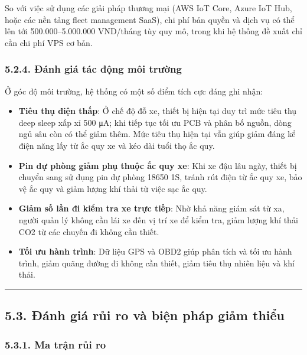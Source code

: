 \documentclass[a4paper]{extarticle}
\providecommand{\tightlist}{%
  \setlength{\itemsep}{0pt}\setlength{\parskip}{0pt}}
\begin{document}
So với việc sử dụng các giải pháp thương mại (AWS IoT Core, Azure IoT
Hub, hoặc các nền tảng fleet management SaaS), chi phí bản quyền và dịch
vụ có thể lên tới 500.000--5.000.000 VND/tháng tùy quy mô, trong khi hệ
thống đề xuất chỉ cần chi phí VPS cơ bản.

\subsubsection{5.2.4. Đánh giá tác động môi
trường}\label{524-ux111uxe1nh-giuxe1-tuxe1c-ux111ux1ed9ng-muxf4i-trux1b0ux1eddng}

Ở góc độ môi trường, hệ thống có một số điểm tích cực đáng ghi nhận:

\begin{itemize}
\tightlist
\item
  \textbf{Tiêu thụ điện thấp}: Ở chế độ đỗ xe, thiết bị hiện tại duy trì
  mức tiêu thụ deep sleep xấp xỉ 500 μA; khi tiếp tục tối ưu PCB và phân
  bố nguồn, dòng ngủ sâu còn có thể giảm thêm. Mức tiêu thụ hiện tại vẫn
  giúp giảm đáng kể điện năng lấy từ ắc quy xe và kéo dài tuổi thọ ắc
  quy.
\item
  \textbf{Pin dự phòng giảm phụ thuộc ắc quy xe}: Khi xe đậu lâu ngày,
  thiết bị chuyển sang sử dụng pin dự phòng 18650 1S, tránh rút điện từ
  ắc quy xe, bảo vệ ắc quy và giảm lượng khí thải từ việc sạc ắc quy.
\item
  \textbf{Giảm số lần đi kiểm tra xe trực tiếp}: Nhờ khả năng giám sát
  từ xa, người quản lý không cần lái xe đến vị trí xe để kiểm tra, giảm
  lượng khí thải CO2 từ các chuyến đi không cần thiết.
\item
  \textbf{Tối ưu hành trình}: Dữ liệu GPS và OBD2 giúp phân tích và tối
  ưu hành trình, giảm quãng đường đi không cần thiết, giảm tiêu thụ
  nhiên liệu và khí thải.
\end{itemize}

\begin{center}\rule{0.5\linewidth}{0.5pt}\end{center}

\subsection{5.3. Đánh giá rủi ro và biện pháp giảm
thiểu}\label{53-ux111uxe1nh-giuxe1-rux1ee7i-ro-vuxe0-biux1ec7n-phuxe1p-giux1ea3m-thiux1ec3u}

\subsubsection{5.3.1. Ma trận rủi
ro}\label{531-ma-trux1eadn-rux1ee7i-ro}
\end{document}
